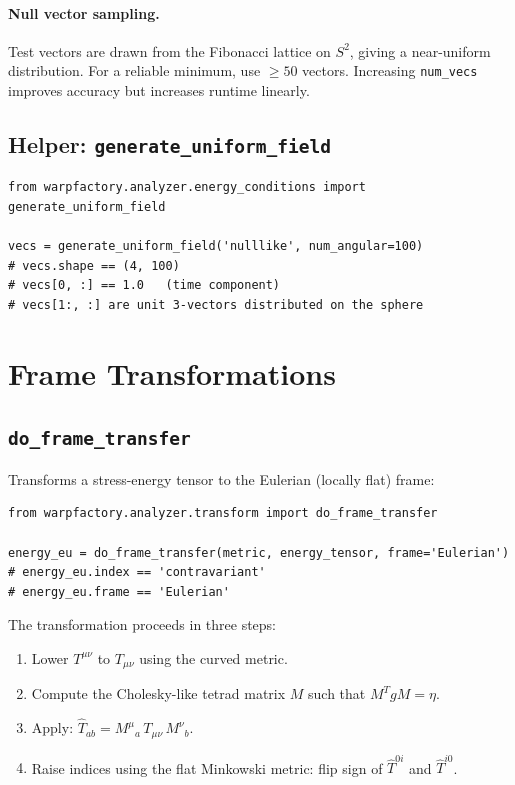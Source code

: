 \documentclass[11pt, a4paper, twoside]{report}
\begin{document}
\paragraph{Null vector sampling.}
Test vectors are drawn from the Fibonacci lattice on $S^2$, giving a
near-uniform distribution.  For a reliable minimum, use $\geq 50$
vectors.  Increasing \texttt{num\_vecs} improves accuracy but increases
runtime linearly.

\subsection{Helper: \texttt{generate\_uniform\_field}}

\begin{lstlisting}
from warpfactory.analyzer.energy_conditions import generate_uniform_field

vecs = generate_uniform_field('nulllike', num_angular=100)
# vecs.shape == (4, 100)
# vecs[0, :] == 1.0   (time component)
# vecs[1:, :] are unit 3-vectors distributed on the sphere
\end{lstlisting}

\section{Frame Transformations}
\label{sec:api_transform}

\subsection{\texttt{do\_frame\_transfer}}

Transforms a stress-energy tensor to the Eulerian (locally flat) frame:

\begin{lstlisting}
from warpfactory.analyzer.transform import do_frame_transfer

energy_eu = do_frame_transfer(metric, energy_tensor, frame='Eulerian')
# energy_eu.index == 'contravariant'
# energy_eu.frame == 'Eulerian'
\end{lstlisting}

The transformation proceeds in three steps:
\begin{enumerate}
  \item Lower $T^{\mu\nu}$ to $T_{\mu\nu}$ using the curved metric.
  \item Compute the Cholesky-like tetrad matrix $M$ such that
        $M^T g M = \eta$.
  \item Apply: $\hat{T}_{ab} = M^\mu{}_a\,T_{\mu\nu}\,M^\nu{}_b$.
  \item Raise indices using the flat Minkowski metric: flip sign of
        $\hat{T}^{0i}$ and $\hat{T}^{i0}$.
\end{enumerate}
\end{document}

